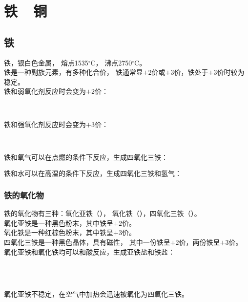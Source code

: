 \documentclass[UTF8]{ctexart}
\begin{document}
\newpage

\section{铁~~铜}

\subsection{铁}
    铁，银白色金属，
    熔点1535$^{\circ}$C，
    沸点2750$^{\circ}$C。\\[3mm]
    铁是一种副族元素，有多种化合价，
    铁通常显$+2$价或$+3$价，铁处于$+3$价时较为稳定。\\[3mm]
    铁和弱氧化剂反应时会变为$+2$价：
    \begin{center}
        \\[1mm]
    \end{center}
    \vspace{5pt}
    铁和强氧化剂反应时会变为$+3$价：
    \begin{center}
        \\[1mm]
    \end{center}
    \vspace{20pt}
    铁和氧气可以在点燃的条件下反应，生成四氧化三铁：
    \begin{center}
    \end{center}
    \vspace{10pt}
    铁和水可以在高温的条件下反应，生成四氧化三铁和氢气：
    \begin{center}
    \end{center}
    \vspace{15pt}

\subsubsection{铁的氧化物}
    铁的氧化物有三种：氧化亚铁（），
    氧化铁（），四氧化三铁（）。\\[4mm]
    氧化亚铁是一种黑色粉末，其中铁呈$+2$价。\\[2mm]
    氧化铁是一种红棕色粉末，其中铁呈$+3$价。\\[2mm]
    四氧化三铁是一种黑色晶体，具有磁性，
    其中一份铁呈$+2$价，两份铁呈$+3$价。\\[4mm]
    氧化亚铁和氧化铁均可以和酸反应，生成亚铁盐和铁盐：
    \begin{center}
        \\[1mm]
        \\[5mm]
    \end{center}
    氧化亚铁不稳定，在空气中加热会迅速被氧化为四氧化三铁。
\end{document}
